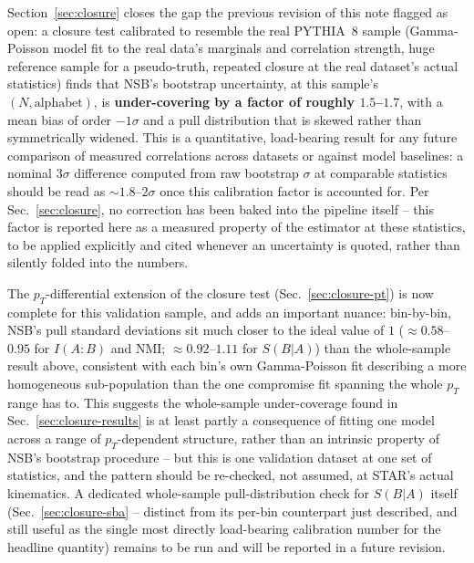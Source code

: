 \documentclass[11pt]{article}
\newcommand{\SBA}{S(B|A)}
\newcommand{\NMI}{\mathrm{NMI}}
\begin{document}
Section~\ref{sec:closure} closes the gap the previous revision of this
note flagged as open: a closure test calibrated to resemble the real
PYTHIA~8 sample (Gamma-Poisson model fit to the real data's marginals and
correlation strength, huge reference sample for a pseudo-truth, repeated
closure at the real dataset's actual statistics) finds that NSB's
bootstrap uncertainty, at this sample's $(N,\text{alphabet})$, is
\textbf{under-covering by a factor of roughly $1.5$--$1.7$}, with a mean
bias of order $-1\sigma$ and a pull distribution that is skewed rather
than symmetrically widened. This is a quantitative, load-bearing result
for any future comparison of measured correlations across datasets or
against model baselines: a nominal $3\sigma$ difference computed from raw
bootstrap $\sigma$ at comparable statistics should be read as
$\sim\!1.8$--$2\sigma$ once this calibration factor is accounted for. Per
Sec.~\ref{sec:closure}, no correction has been baked into the pipeline
itself -- this factor is reported here as a measured property of the
estimator at these statistics, to be applied explicitly and cited
whenever an uncertainty is quoted, rather than silently folded into the
numbers.

The $p_T$-differential extension of the closure test (Sec.~\ref{sec:closure-pt})
is now complete for this validation sample, and adds an important
nuance: bin-by-bin, NSB's pull standard deviations sit much closer to
the ideal value of $1$ ($\approx0.58$--$0.95$ for $I(A{:}B)$ and $\NMI$;
$\approx0.92$--$1.11$ for $\SBA$) than the whole-sample result above,
consistent with each bin's own Gamma-Poisson fit describing a more
homogeneous sub-population than the one compromise fit spanning the
whole $p_T$ range has to. This suggests the whole-sample
under-coverage found in Sec.~\ref{sec:closure-results} is at least
partly a consequence of fitting one model across a range of
$p_T$-dependent structure, rather than an intrinsic property of NSB's
bootstrap procedure -- but this is one validation dataset at one set of
statistics, and the pattern should be re-checked, not assumed, at
STAR's actual kinematics. A dedicated whole-sample pull-distribution
check for $\SBA$ itself (Sec.~\ref{sec:closure-sba} -- distinct from its
per-bin counterpart just described, and still useful as the single most
directly load-bearing calibration number for the headline quantity)
remains to be run and will be reported in a future revision.
\end{document}
